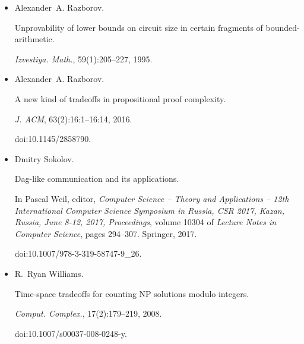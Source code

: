 \documentclass[10pt,a4paper]{article}
\begin{document}
\begin{itemize}
Pavel Pudlák.


On extracting computations from propositional proofs (a survey).


In Kamal Lodaya and Meena Mahajan, editors, \emph{IARCS Annual
Conference on Foundations of Software Technology and Theoretical Computer
Science, FSTTCS 2010, December 15-18, 2010, Chennai, India}, volume 8 of
\emph{LIPIcs}, pages 30–41. Schloss Dagstuhl – Leibniz-Zentrum für
Informatik, 2010.


doi:10.4230/LIPIcs.FSTTCS.2010.30.





\item[] 
[23]

Alexander A. Razborov.


Unprovability of lower bounds on circuit size in certain fragments of
bounded-arithmetic.


\emph{Izvestiya. Math.}, 59(1):205–227, 1995.





\item[] 
[24]

Alexander A. Razborov.


A new kind of tradeoffs in propositional proof complexity.


\emph{J. ACM}, 63(2):16:1–16:14, 2016.


doi:10.1145/2858790.





\item[] 
[25]

Dmitry Sokolov.


Dag-like communication and its applications.


In Pascal Weil, editor, \emph{Computer Science – Theory and
Applications – 12th International Computer Science Symposium in Russia,
CSR 2017, Kazan, Russia, June 8-12, 2017, Proceedings}, volume 10304 of
\emph{Lecture Notes in Computer Science}, pages 294–307. Springer, 2017.


doi:10.1007/978-3-319-58747-9\_26.





\item[] 
[26]

R. Ryan Williams.


Time-space tradeoffs for counting NP solutions modulo integers.


\emph{Comput. Complex.}, 17(2):179–219, 2008.


doi:10.1007/s00037-008-0248-y.





\end{itemize}
\end{document}
